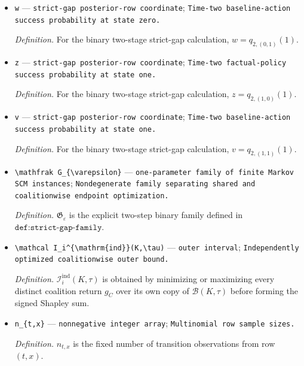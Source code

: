 \documentclass{article}
\begin{document}
\begin{itemize}
  \item \texttt{w} --- \texttt{strict-\allowbreak{}gap posterior-\allowbreak{}row coordinate}; \texttt{Time-\allowbreak{}two baseline-\allowbreak{}action success probability at state zero.}
  \par\smallskip\noindent\emph{Definition.} For the binary two-stage strict-gap calculation, \(w=q_{2,(0,1)}(1)\).
  \item \texttt{z} --- \texttt{strict-\allowbreak{}gap posterior-\allowbreak{}row coordinate}; \texttt{Time-\allowbreak{}two factual-\allowbreak{}policy success probability at state one.}
  \par\smallskip\noindent\emph{Definition.} For the binary two-stage strict-gap calculation, \(z=q_{2,(1,0)}(1)\).
  \item \texttt{v} --- \texttt{strict-\allowbreak{}gap posterior-\allowbreak{}row coordinate}; \texttt{Time-\allowbreak{}two baseline-\allowbreak{}action success probability at state one.}
  \par\smallskip\noindent\emph{Definition.} For the binary two-stage strict-gap calculation, \(v=q_{2,(1,1)}(1)\).
  \item \texttt{\textbackslash{}\allowbreak{}mathfrak G\_\allowbreak{}\{\textbackslash{}\allowbreak{}varepsilon\}\allowbreak{}} --- \texttt{one-\allowbreak{}parameter family of finite Markov SCM instances}; \texttt{Nondegenerate family separating shared and coalitionwise endpoint optimization.}
  \par\smallskip\noindent\emph{Definition.} \(\mathfrak G_{\varepsilon}\) is the explicit two-step binary family defined in \(\texttt{def:strict-gap-family}\).
  \item \texttt{\textbackslash{}\allowbreak{}mathcal I\_\allowbreak{}i\textasciicircum{}\{\textbackslash{}\allowbreak{}mathrm\{ind\}\allowbreak{}\}\allowbreak{}(K,\allowbreak{}\textbackslash{}\allowbreak{}tau)} --- \texttt{outer interval}; \texttt{Independently optimized coalitionwise outer bound.}
  \par\smallskip\noindent\emph{Definition.} \(\mathcal I_i^{\mathrm{ind}}(K,\tau)\) is obtained by minimizing or maximizing every distinct coalition return \(g_C\) over its own copy of \(\mathcal B(K,\tau)\) before forming the signed Shapley sum.
  \item \texttt{n\_\allowbreak{}\{t,\allowbreak{}x\}\allowbreak{}} --- \texttt{nonnegative integer array}; \texttt{Multinomial row sample sizes.}
  \par\smallskip\noindent\emph{Definition.} \(n_{t,x}\) is the fixed number of transition observations from row \((t,x)\).

\end{itemize}
\end{document}
